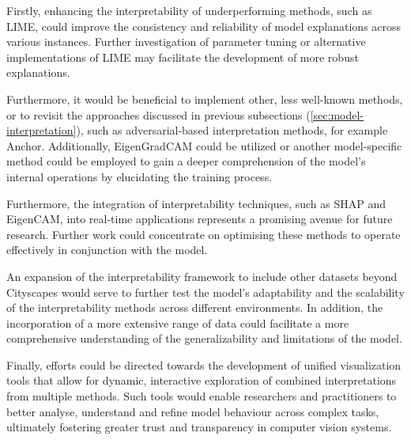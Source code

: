 Firstly, enhancing the interpretability of underperforming methods, such as LIME, could improve the consistency and reliability of model explanations across various instances.
Further investigation of parameter tuning or alternative implementations of LIME may facilitate the development of more robust explanations.

Furthermore, it would be beneficial to implement other, less well-known methods, or to revisit the approaches discussed in previous subsections (\ref{sec:model-interpretation}), such as adversarial-based interpretation methods, for example Anchor\cite{LIANG2021168}.
Additionally, EigenGradCAM could be utilized or another model-specific method could be employed to gain a deeper comprehension of the model's internal operations by elucidating the training process.

Furthermore, the integration of interpretability techniques, such as SHAP and EigenCAM, into real-time applications represents a promising avenue for future research.
Further work could concentrate on optimising these methods to operate effectively in conjunction with the model.

An expansion of the interpretability framework to include other datasets beyond Cityscapes would serve to further test the model's adaptability and the scalability of the interpretability methods across different environments. In addition, the incorporation of a more extensive range of data could facilitate a more comprehensive understanding of the generalizability and limitations of the model.

Finally, efforts could be directed towards the development of unified visualization tools that allow for dynamic, interactive exploration of combined interpretations from multiple methods.
Such tools would enable researchers and practitioners to better analyse, understand and refine model behaviour across complex tasks, ultimately fostering greater trust and transparency in computer vision systems.



